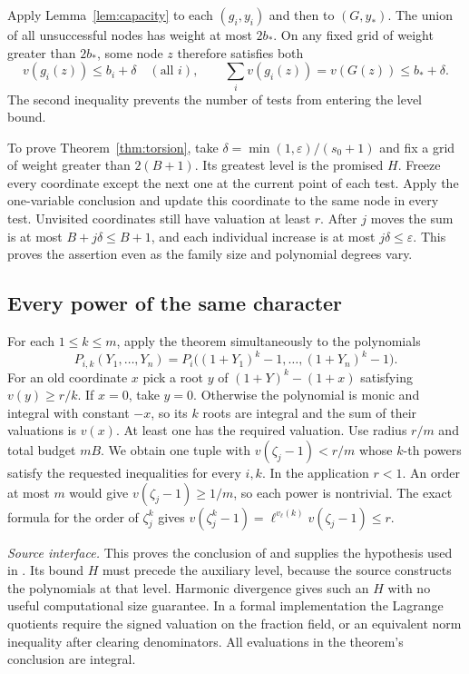 Apply Lemma~\ref{lem:capacity} to each $(g_i,y_i)$ and then to $(G,y_*)$. The union of all unsuccessful nodes has weight at most $2b_*$. On any fixed grid of weight greater than $2b_*$, some node $z$ therefore satisfies both
\[
 v(g_i(z))\le b_i+\delta\quad(\text{all }i),\qquad
 \sum_i v(g_i(z))=v(G(z))\le b_*+\delta.
\]
The second inequality prevents the number of tests from entering the level bound.

To prove Theorem~\ref{thm:torsion}, take $\delta=\min(1,\varepsilon)/(s_0+1)$ and fix a grid of weight greater than $2(B+1)$. Its greatest level is the promised $H$. Freeze every coordinate except the next one at the current point of each test. Apply the one-variable conclusion and update this coordinate to the same node in every test. Unvisited coordinates still have valuation at least $r$. After $j$ moves the sum is at most $B+j\delta\le B+1$, and each individual increase is at most $j\delta\le\varepsilon$. This proves the assertion even as the family size and polynomial degrees vary.

\subsection*{Every power of the same character}
For each $1\le k\le m$, apply the theorem simultaneously to the polynomials
\[
 P_{i,k}(Y_1,\ldots,Y_n)=P_i\big((1+Y_1)^k-1,\ldots,(1+Y_n)^k-1\big).
\]
For an old coordinate $x$ pick a root $y$ of $(1+Y)^k-(1+x)$ satisfying $v(y)\ge r/k$. If $x=0$, take $y=0$. Otherwise the polynomial is monic and integral with constant $-x$, so its $k$ roots are integral and the sum of their valuations is $v(x)$. At least one has the required valuation. Use radius $r/m$ and total budget $mB$. We obtain one tuple with $v(\zeta_j-1)<r/m$ whose $k$-th powers satisfy the requested inequalities for every $i,k$. In the application $r<1$. An order at most $m$ would give $v(\zeta_j-1)\ge 1/m$, so each power is nontrivial. The exact formula for the order of $\zeta_j^k$ gives $v(\zeta_j^k-1)=\ell^{v_\ell(k)}v(\zeta_j-1)\le r$.

\noindent\textit{Source interface.} This proves the conclusion of  and supplies the hypothesis used in . Its bound $H$ must precede the auxiliary level, because the source constructs the polynomials at that level. Harmonic divergence gives such an $H$ with no useful computational size guarantee. In a formal implementation the Lagrange quotients require the signed valuation on the fraction field, or an equivalent norm inequality after clearing denominators. All evaluations in the theorem's conclusion are integral.

